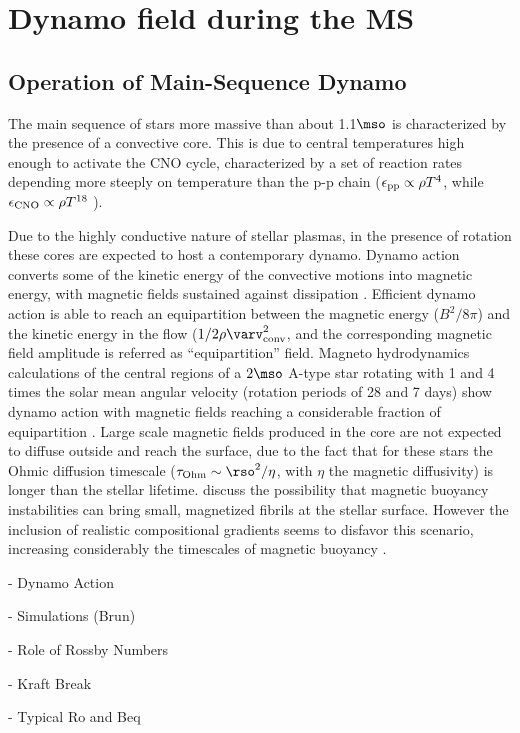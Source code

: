 \section{Dynamo field during the MS}
\subsection{Operation of Main-Sequence Dynamo}
The main sequence of stars more massive than about 1.1$\mso$ is characterized by the presence of a convective core.
This is due to central temperatures high enough to activate the CNO cycle, characterized by a set of reaction rates depending more steeply on temperature than the p-p chain ($\epsilon_{\rm pp}\propto \rho T^{4}$, while $\epsilon_{\rm CNO}\propto \rho T^{18}$ ).

Due to the highly conductive nature of stellar plasmas, in the presence of rotation
these cores are expected to host a contemporary dynamo. Dynamo action converts some of the kinetic energy 
of the convective motions into magnetic energy, with magnetic fields sustained against dissipation  \citep[see e.g.,][]{Brandenburg_2005}. Efficient dynamo action is able to reach an equipartition between the magnetic energy ($B^2/8\pi$) and the kinetic energy in the flow ($1/2\rho\varv^2_{\rm conv}$, and the corresponding magnetic field amplitude is referred as ``equipartition'' field.
Magneto hydrodynamics calculations of the central regions of a  $2\mso$ A-type star rotating with 
1 and 4 times the solar mean angular velocity (rotation periods of 28 and 7 days) show dynamo action 
with magnetic fields reaching a considerable fraction of equipartition \citep{Brun_2005}.
Large scale magnetic fields produced in the core are not expected to diffuse outside and reach the surface, due to the fact that for these stars the Ohmic diffusion timescale ($\tau_{\rm Ohm}\sim \rso^2/\eta$, with $\eta$ the magnetic diffusivity) is longer than the stellar lifetime. \citet{MacGregor_2003} discuss the possibility that magnetic buoyancy instabilities can bring small, magnetized fibrils at the stellar surface. However the inclusion of realistic compositional gradients seems to disfavor this scenario, increasing considerably the timescales of magnetic buoyancy \citep{MacDonald_2004}.  




- Dynamo Action

- Simulations (Brun)

- Role of Rossby Numbers

- Kraft Break
  
- Typical Ro and Beq   
  
  
  
  
  
  